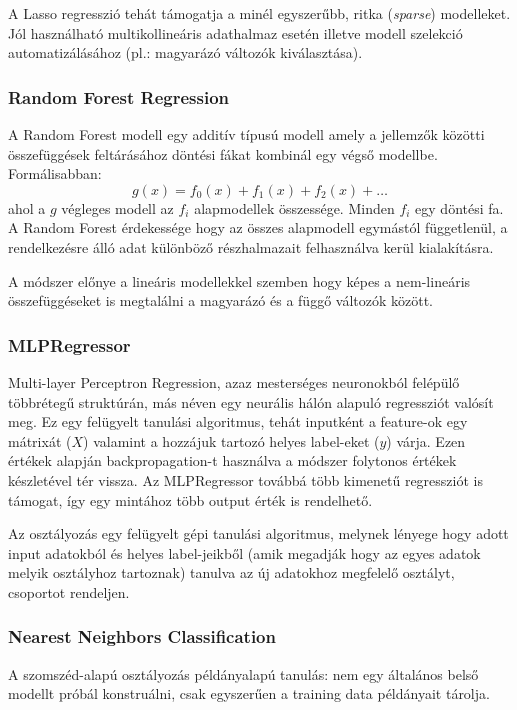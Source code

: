 A Lasso regresszió tehát támogatja a minél egyszerűbb, ritka (\textit{sparse}) modelleket. Jól használható multikollineáris adathalmaz esetén illetve modell szelekció automatizálásához (pl.: magyarázó változók kiválasztása).



\subsubsection{Random Forest Regression}
A Random Forest modell egy additív típusú modell amely a jellemzők közötti összefüggések feltárásához döntési fákat kombinál egy végső modellbe. Formálisabban:
$$ g(x) = f_0(x) + f_1(x) + f_2(x) + \dots$$
ahol a $g$ végleges modell az $f_i$ alapmodellek összessége. Minden $f_i$ egy döntési fa. A Random Forest érdekessége hogy az összes alapmodell egymástól függetlenül, a rendelkezésre álló adat különböző részhalmazait felhasználva kerül kialakításra.

A módszer előnye a lineáris modellekkel szemben hogy képes a nem-lineáris összefüggéseket is megtalálni a magyarázó és a függő változók között.



\subsubsection{MLPRegressor} \label{ssec:mlpregressor}
Multi-layer Perceptron Regression, azaz mesterséges neuronokból felépülő többrétegű struktúrán, más néven egy neurális hálón alapuló regressziót valósít meg. Ez egy felügyelt tanulási algoritmus, tehát inputként a feature-ok egy mátrixát ($X$) valamint a hozzájuk tartozó helyes label-eket ($y$) várja. Ezen értékek alapján backpropagation-t használva a módszer folytonos értékek készletével tér vissza. Az MLPRegressor továbbá több kimenetű regressziót is támogat, így egy mintához több output érték is rendelhető.


Az osztályozás egy felügyelt gépi tanulási algoritmus, melynek lényege hogy adott input adatokból és helyes label-jeikből (amik megadják hogy az egyes adatok melyik osztályhoz tartoznak) tanulva az új adatokhoz megfelelő osztályt, csoportot rendeljen. 
\subsubsection{Nearest Neighbors Classification}

A szomszéd-alapú osztályozás példányalapú tanulás: nem egy általános belső modellt próbál konstruálni, csak egyszerűen a training data példányait tárolja.

